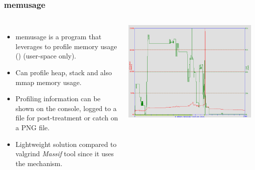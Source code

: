 \begin{frame}[fragile]
  \frametitle{memusage}
  \begin{columns}[T]
    \begin{itemize}
      \item memusage is a program that leverages  to profile
            memory usage () (user-space only).
      \item Can profile heap, stack and also mmap memory usage.
      \item Profiling information can be shown on the console, logged to
        a file for post-treatment or catch on a PNG file.
      \item Lightweight solution compared to valgrind {\em Massif} tool since it
            uses the  mechanism.
    \end{itemize}
    \includegraphics[width=\textwidth]{../slides/debugging-application-profiling/memusage.png}
  \end{columns}
\end{frame}

